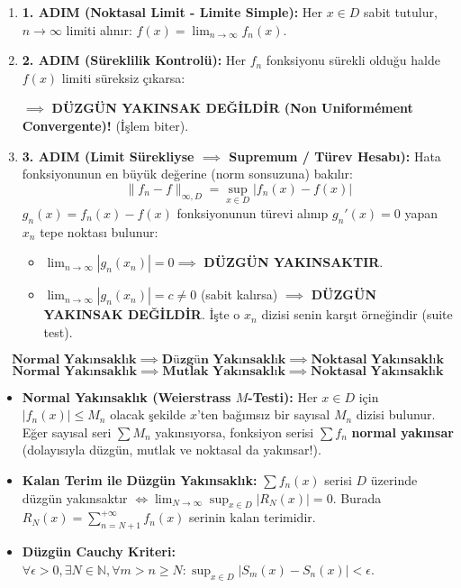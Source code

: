 \documentclass[11pt,a4paper]{article}
\begin{document}
\begin{tcolorbox}[colback=teal!5!white,colframe=teal!75!black,title=\textbf{Fonksiyon Dizileri ($f_n(x)$) --- 3 Adımlı Standart Şablon}]
\begin{enumerate}[leftmargin=*]
    \item \textbf{1. ADIM (Noktasal Limit - Limite Simple):} Her $x \in D$ sabit tutulur, $n \to \infty$ limiti alınır: $f(x) = \lim_{n \to \infty} f_n(x)$.
    \item \textbf{2. ADIM (Süreklilik Kontrolü):} 
    Her $f_n$ fonksiyonu sürekli olduğu halde $f(x)$ limiti süreksiz çıkarsa:
    \begin{center}
    $\implies$ \textbf{DÜZGÜN YAKINSAK DEĞİLDİR (Non Uniformément Convergente)!} (İşlem biter).
    \end{center}
    \item \textbf{3. ADIM (Limit Sürekliyse $\implies$ Supremum / Türev Hesabı):}
    Hata fonksiyonunun en büyük değerine (norm sonsuzuna) bakılır:
    \[ \|f_n - f\|_{\infty, D} = \sup_{x \in D} |f_n(x) - f(x)| \]
    $g_n(x) = f_n(x) - f(x)$ fonksiyonunun türevi alınıp $g_n'(x) = 0$ yapan $x_n$ tepe noktası bulunur:
    \begin{itemize}
        \item $\lim_{n \to \infty} |g_n(x_n)| = 0 \implies$ \textbf{DÜZGÜN YAKINSAKTIR}.
        \item $\lim_{n \to \infty} |g_n(x_n)| = c \neq 0$ (sabit kalırsa) $\implies$ \textbf{DÜZGÜN YAKINSAK DEĞİLDİR}. İşte o $x_n$ dizisi senin karşıt örneğindir (suite test).
    \end{itemize}
\end{enumerate}
\end{tcolorbox}

\begin{tcolorbox}[colback=green!5!white,colframe=green!60!black,title=\textbf{Fonksiyon Serileri ($\sum f_n(x)$) --- Yakınsaklık Hiyerarşisi}]
\[ \textbf{Normal Yakınsaklık} \implies \textbf{Düzgün Yakınsaklık} \implies \textbf{Noktasal Yakınsaklık} \]
\[ \textbf{Normal Yakınsaklık} \implies \textbf{Mutlak Yakınsaklık} \implies \textbf{Noktasal Yakınsaklık} \]
\begin{itemize}[leftmargin=*]
    \item \textbf{Normal Yakınsaklık (Weierstrass $M$-Testi):}
    Her $x \in D$ için $|f_n(x)| \le M_n$ olacak şekilde $x$'ten bağımsız bir sayısal $M_n$ dizisi bulunur.
    Eğer sayısal seri $\sum M_n$ yakınsıyorsa, fonksiyon serisi $\sum f_n$ \textbf{normal yakınsar} (dolayısıyla düzgün, mutlak ve noktasal da yakınsar!).
    \item \textbf{Kalan Terim ile Düzgün Yakınsaklık:}
    $\sum f_n(x)$ serisi $D$ üzerinde düzgün yakınsaktır $\iff \lim_{N \to \infty} \sup_{x \in D} |R_N(x)| = 0$.
    Burada $R_N(x) = \sum_{n=N+1}^{+\infty} f_n(x)$ serinin kalan terimidir.
    \item \textbf{Düzgün Cauchy Kriteri:}
    $\forall \epsilon > 0, \exists N \in \mathbb{N}, \forall m > n \ge N : \sup_{x \in D} |S_m(x) - S_n(x)| < \epsilon$.
\end{itemize}
\end{tcolorbox}
\end{document}
